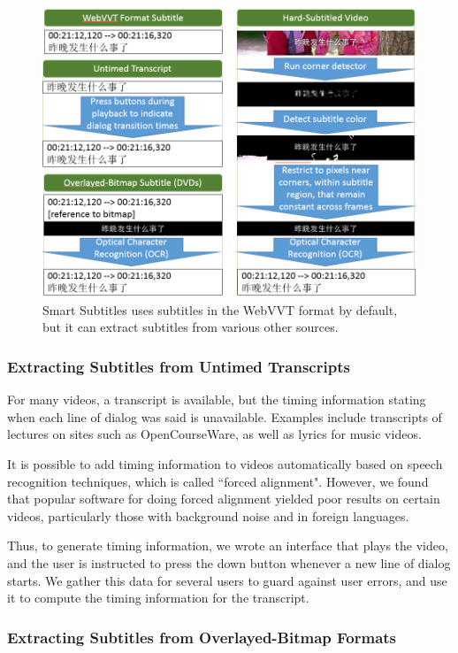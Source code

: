 \documentclass{sigchi}
\begin{document}
\begin{figure}[!h]
\centering
\includegraphics[width=\columnwidth]{subtitle-sources}
\caption{Smart Subtitles uses subtitles in the WebVVT format
by default, but it can extract subtitles from various other sources.}
\label{fig:figure3}
\end{figure}

\subsubsection{Extracting Subtitles from Untimed Transcripts}

For many videos, a transcript is available, but the timing information
stating when each line of dialog was said is unavailable.
Examples include transcripts of lectures on sites such as
OpenCourseWare, as well as lyrics for music videos.

It is possible to add timing information to videos automatically based on speech recognition techniques, which is called ``forced alignment".
However, we found that popular software for doing forced alignment
yielded poor results on certain videos, particularly those with background
noise and in foreign languages.

Thus, to generate timing information,
we wrote an interface that plays the video,
and the user is instructed to press the down button whenever a new
line of dialog starts.
We gather this data for several users to guard against user errors,
and use it to compute the timing information for the transcript.

\subsubsection{Extracting Subtitles from Overlayed-Bitmap Formats}
\end{document}
